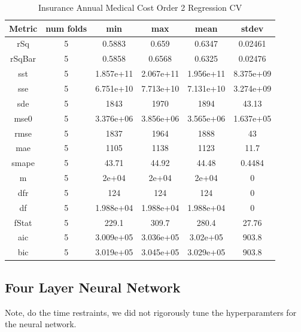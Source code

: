 \documentclass{article}
\begin{document}
\begin{table}[H]
\centering
\caption{Insurance Annual Medical Cost Order 2 Regression CV}
\label{tab:Insurance Annual Medical Cost Order 2 Regression CV}
\begin{tabular}{|c|c|c|c|c|c|}\hline
Metric & num folds & min & max & mean & stdev \\ \hline \hline
rSq & 5 & 0.5883 & 0.659 & 0.6347 & 0.02461 \\ \hline
rSqBar & 5 & 0.5858 & 0.6568 & 0.6325 & 0.02476 \\ \hline
sst & 5 & 1.857e+11 & 2.067e+11 & 1.956e+11 & 8.375e+09 \\ \hline
sse & 5 & 6.751e+10 & 7.713e+10 & 7.131e+10 & 3.274e+09 \\ \hline
sde & 5 & 1843 & 1970 & 1894 & 43.13 \\ \hline
mse0 & 5 & 3.376e+06 & 3.856e+06 & 3.565e+06 & 1.637e+05 \\ \hline
rmse & 5 & 1837 & 1964 & 1888 & 43 \\ \hline
mae & 5 & 1105 & 1138 & 1123 & 11.7 \\ \hline
smape & 5 & 43.71 & 44.92 & 44.48 & 0.4484 \\ \hline
m & 5 & 2e+04 & 2e+04 & 2e+04 & 0 \\ \hline
dfr & 5 & 124 & 124 & 124 & 0 \\ \hline
df & 5 & 1.988e+04 & 1.988e+04 & 1.988e+04 & 0 \\ \hline
fStat & 5 & 229.1 & 309.7 & 280.4 & 27.76 \\ \hline
aic & 5 & 3.009e+05 & 3.036e+05 & 3.02e+05 & 903.8 \\ \hline
bic & 5 & 3.019e+05 & 3.045e+05 & 3.029e+05 & 903.8 \\ \hline
\end{tabular}
\end{table}


\subsection{Four Layer Neural Network}

Note, do the time restraints, we did not rigorously tune the hyperparamters for the neural network.
\end{document}
